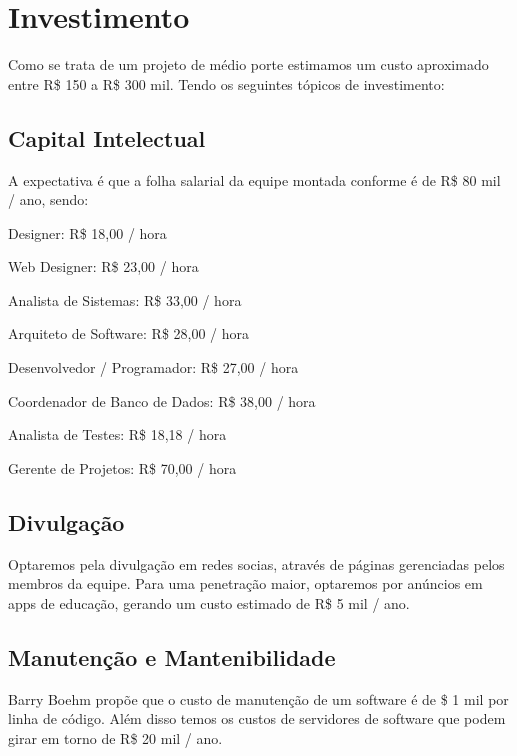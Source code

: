 \chapter[Investimento]{Investimento}

Como se trata de um projeto de médio porte estimamos um custo aproximado entre R\$ 150 a R\$ 300 mil. Tendo os seguintes tópicos de investimento:

    \section[Capital Intelectual]{Capital Intelectual} 
        A expectativa é que a folha salarial da equipe montada conforme é de R\$ 80 mil / ano, sendo:
        
    \begin{alineas}
        \item Designer: R\$ 18,00 / hora
        \item Web Designer: R\$ 23,00 / hora
        \item Analista de Sistemas: R\$ 33,00 / hora
        \item Arquiteto de Software: R\$ 28,00 / hora
        \item Desenvolvedor / Programador: R\$ 27,00 / hora
        \item Coordenador de Banco de Dados: R\$ 38,00 / hora
        \item Analista de Testes: R\$ 18,18 / hora
        \item Gerente de Projetos: R\$ 70,00 / hora
\end{alineas}

    \section[Divulgação]{Divulgação} 
        Optaremos pela divulgação em redes socias, através de páginas gerenciadas pelos membros da equipe. Para uma penetração maior, optaremos por anúncios em apps de educação, gerando um custo estimado de R\$ 5 mil / ano.
    \section[Manutenção e Mantenabilidade]{Manutenção e Mantenibilidade}
        Barry Boehm propõe que o custo de manutenção de um software é de \$ 1 mil por linha de código. Além disso temos os custos de servidores de software que podem girar em torno de R\$ 20 mil / ano.

